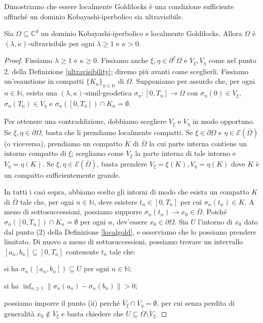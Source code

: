 Dimostriamo che essere localmente Goldilocks è una condizione sufficiente affinché un dominio Kobayashi-iperbolico sia ultravisibile.

\begin{prop}
    Sia $\Omega\subseteq\mathbb{C}^d$ un dominio Kobayashi-iperbolico e localmente Goldilocks. Allora $\Omega$ è $(\lambda,\kappa)$-ultravisibile per ogni $\lambda\ge1$ e $\kappa>0$.
\end{prop}

\begin{proof}
    Fissiamo $\lambda\ge1$ e $\kappa\ge0$. Fissiamo anche $\xi,\eta\in\partial^\mathcal{E}\Omega$ e $V_\xi,V_\eta$ come nel punto 2. della Definizione \ref{ultravisibility}; diremo più avanti come sceglierli. Fissiamo un'esaustione in compatti $\{K_n\}_{n\in\mathbb{N}}$ di $\Omega$. Supponiamo per assurdo che, per ogni $n\in\mathbb{N}$, esista una $(\lambda,\kappa)$-simil-geodetica $\sigma_n:[0,T_n]\longrightarrow\Omega$ con $\sigma_n(0)\in V_\xi$, $\sigma_n(T_n)\in V_\eta$ e ${\sigma_n([0,T_n])\cap K_n=\emptyset}$.

    Per ottenere una contraddizione, dobbiamo scegliere $V_\xi$ e $V_\eta$ in modo opportuno. Se $\xi,\eta\in\partial\Omega$, basta che li prendiamo localmente compatti. Se $\xi\in\partial\Omega$ e $\eta\in\mathcal{E}(\overline{\Omega})$ (o viceversa), prendiamo un compatto $K$ di $\overline{\Omega}$ la cui parte interna contiene un intorno compatto di $\xi$; scegliamo come $V_\xi$ la parte interna di tale intorno e $V_\eta=\eta(K)$. Se $\xi,\eta\in\mathcal{E}(\overline{\Omega})$, basta prendere $V_\xi=\xi(K),V_\eta=\eta(K)$ dove $K$ è un compatto sufficientemente grande.

    In tutti i casi sopra, abbiamo scelto gli intorni di modo che esista un compatto $K$ di $\overline{\Omega}$ tale che, per ogni $n\in\mathbb{N}$, deve esistere $t_n\in[0,T_n]$ per cui $\sigma_n(t_n)\in K$. A meno di sottosuccessioni, possiamo supporre $\sigma_n(t_n)\longrightarrow x_0\in\overline{\Omega}$. Poiché $\sigma_n([0,T_n])\cap K_n=\emptyset$ per ogni $n$, dev'essere $x_0\in\partial\Omega$. Sia $U$ l'intorno di $x_0$ dato dal punto (2) della Definizione \ref{localgold}, e osserviamo che lo possiamo prendere limitato. Di nuovo a meno di sottosuccessioni, possiamo trovare un intervallo $[a_n,b_n]\subseteq[0,T_n]$ contenente $t_n$ tale che:
    \begin{nlist}
        \item si ha $\sigma_n([a_n,b_n])\subseteq U$ per ogni $n\in\mathbb{N}$;
        \item si ha $\displaystyle\inf_{n\ge 1}\|\sigma_n(a_n)-\sigma_n(b_n)\|>0$;
    \end{nlist}
    possiamo imporre il punto (ii) perché $\overline{V}_\xi\cap\overline{V}_\eta=\emptyset$, per cui senza perdita di generalità $x_0\not\in\overline{V}_\xi$ e basta chiedere che $U\subseteq\overline{\Omega}\setminus\overline{V}_\xi$.


\end{proof}
